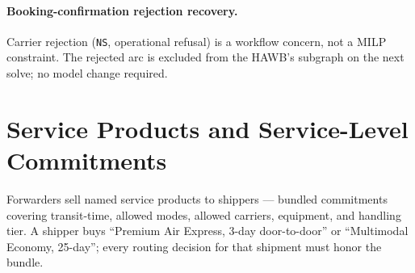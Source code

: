 \documentclass[11pt,a4paper]{article}
\theoremstyle{definition}
\begin{document}
\paragraph{Booking-confirmation rejection recovery.}
Carrier rejection (\texttt{NS}, operational refusal) is a workflow
concern, not a MILP constraint. The rejected arc is excluded from the
HAWB's subgraph on the next solve; no model change required.

\section{Service Products and Service-Level Commitments}
\label{sec:service-products}

Forwarders sell named service products to shippers --- bundled commitments
covering transit-time, allowed modes, allowed carriers, equipment, and
handling tier. A shipper buys ``Premium Air Express, 3-day door-to-door'' or
``Multimodal Economy, 25-day''; every routing decision for that shipment must
honor the bundle.
\end{document}
